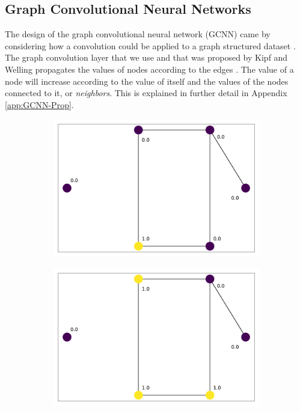 \documentclass[../thesis.tex]{subfiles}
\begin{document}
\subsection{Graph Convolutional Neural Networks}\label{subsec:GCNN}
The design of the graph convolutional neural network (GCNN) came by considering how a convolution could be applied to a graph structured dataset \cite{GCNN_Kipf}.
The graph convolution layer that we use and that was proposed by Kipf and Welling propagates the values of nodes according to the edges \cite{GCNN_Kipf}.
The value of a node will increase according to the value of itself and the values of the nodes connected to it, or \textit{neighbors}.
This is explained in further detail in Appendix \ref{app:GCNN-Prop}.
\begin{figure}[t]
	\centering
	\begin{subfigure}{0.45\textwidth}
		\includegraphics[width=\textwidth]{figures/graph_signal-00.pdf}
		\caption{}
		\label{fig:prop-ex-0}
	\end{subfigure}
	\begin{subfigure}{0.45\textwidth}
		\includegraphics[width=\textwidth]{figures/graph_signal-01.pdf}

\end{subfigure}
\end{figure}
\end{document}

